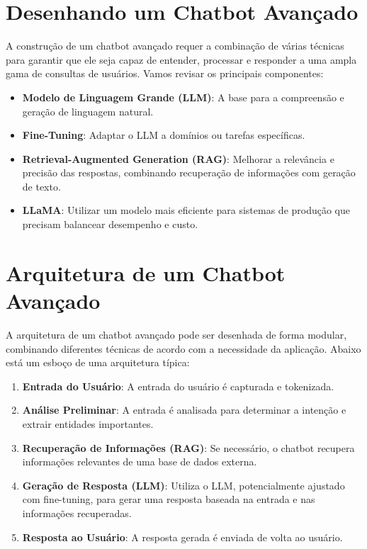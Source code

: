 \documentclass[14pt,a4paper,oneside]{book}
\begin{document}
\section{Desenhando um Chatbot Avançado}

A construção de um chatbot avançado requer a combinação de várias técnicas para garantir que ele seja capaz de entender, processar e responder a uma ampla gama de consultas de usuários. Vamos revisar os principais componentes:

\begin{itemize}
	\item \textbf{Modelo de Linguagem Grande (LLM)}: A base para a compreensão e geração de linguagem natural.
	\item \textbf{Fine-Tuning}: Adaptar o LLM a domínios ou tarefas específicas.
	\item \textbf{Retrieval-Augmented Generation (RAG)}: Melhorar a relevância e precisão das respostas, combinando recuperação de informações com geração de texto.
	\item \textbf{LLaMA}: Utilizar um modelo mais eficiente para sistemas de produção que precisam balancear desempenho e custo.
\end{itemize}

\section{Arquitetura de um Chatbot Avançado}

A arquitetura de um chatbot avançado pode ser desenhada de forma modular, combinando diferentes técnicas de acordo com a necessidade da aplicação. Abaixo está um esboço de uma arquitetura típica:

\begin{enumerate}
	\item \textbf{Entrada do Usuário}: A entrada do usuário é capturada e tokenizada.
	\item \textbf{Análise Preliminar}: A entrada é analisada para determinar a intenção e extrair entidades importantes.
	\item \textbf{Recuperação de Informações (RAG)}: Se necessário, o chatbot recupera informações relevantes de uma base de dados externa.
	\item \textbf{Geração de Resposta (LLM)}: Utiliza o LLM, potencialmente ajustado com fine-tuning, para gerar uma resposta baseada na entrada e nas informações recuperadas.
	\item \textbf{Resposta ao Usuário}: A resposta gerada é enviada de volta ao usuário.
\end{enumerate}
\end{document}

